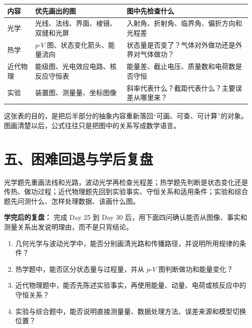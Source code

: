 \begin{center}
\begin{tabular}{p{}p{}p{}}
\toprule
\textbf{内容} & \textbf{优先画出的图} & \textbf{图中先检查什么} \\
\midrule
光学 & 光线、法线、界面、棱镜、双缝和光屏 & 入射角、折射角、临界角、偏折方向和光程差 \\
热学 & $p$-$V$ 图、状态变化箭头、能量流向 & 状态量是否变了？气体对外做功还是外界对气体做功？ \\
近代物理 & 能级图、光电效应电路、核反应守恒表 & 能量差、截止电压、质量数和电荷数是否守恒 \\
实验 & 装置图、测量量、坐标图像 & 斜率代表什么？截距代表什么？主要误差从哪里来？ \\
\bottomrule
\end{tabular}
\end{center}

这张表的目的，是把后半部分的抽象内容重新落回“可画、可查、可计算”的对象。图画清楚以后，公式往往只是把图中的关系写成数学语言。

\section*{五、困难回退与学后复盘}

光学题先重画法线和光路，波动光学再检查光程差；热学题先判断是状态变化还是传热、做功过程；近代物理题先回到实验事实、守恒关系和适用条件；实验和综合题先问测什么、怎样处理数据、该画什么图。

\textbf{学完后的复盘：} 完成 Day 25 到 Day 30 后，用下面四问确认能否从图像、事实和测量关系出发说明理由，而不是只背结论。
\begin{enumerate}[itemsep=0.2em]
  \item 几何光学与波动光学中，能否分别画清光路和传播路径，并说明所用规律的条件？
  \item 热学题中，能否区分状态量与过程量，并从 $p$-$V$ 图判断做功和能量变化？
  \item 近代物理题中，能否先陈述实验事实，再使用能量、动量、电荷或核反应中的守恒关系？
  \item 实验与综合题中，能否说明直接测量量、数据处理方法、误差来源和模型切换位置？
\end{enumerate}

